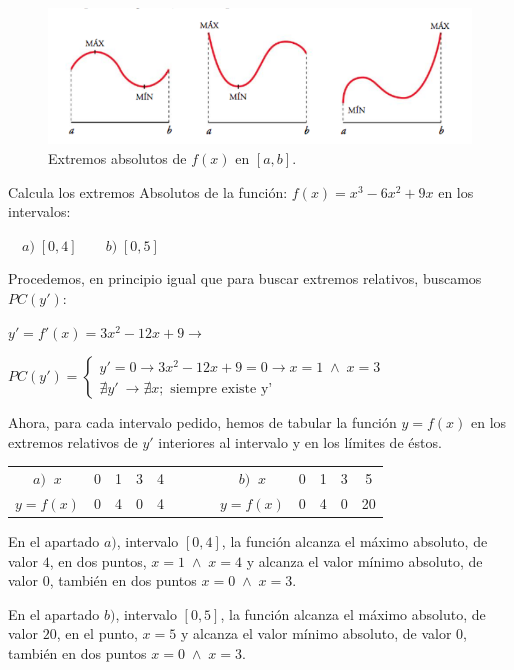 	
	\begin{figure}[H]
		\centering
		\includegraphics[width=1\textwidth]{imagenes/imagenes05/T05IM08.png}
		\caption{Extremos absolutos de $f(x)$ en $[a,b]$.}
	\end{figure}
	
	
	\begin{ejem} Calcula los extremos Absolutos de la función:  $f(x)=x^3-6x^2+9x$ en los intervalos:
	
	$\quad a)\; [0,4] \qquad b)\; [0,5]$
	
	Procedemos, en principio igual que para buscar extremos relativos, buscamos $PC(y')$:
	
	$y'=f'(x)=3x^2-12 x+9 \to $
	
	$PC(y') =\begin{cases}
	y'=0 \to 3x^2-12x+9=0 \to x=1 \; \wedge \; x=3 \\
	\nexists y' \ \to  \nexists x ; \mbox{ siempre existe y'}
	\end{cases}$
	
	Ahora, para cada intervalo pedido, hemos de tabular la función $y=f(x)$ en los extremos relativos de $y'$ interiores al intervalo y en los límites de éstos.
	
	\begin{table}[H]
	\centering
	\begin{tabular}{|c|c|c|c|c|c|c|c|c|c|c|}
	\cline{1-5} \cline{7-11}
	 $a) \; \;  x$& 0& 1 & 3 & 4 & $\qquad$ & $b)\; \;  x$ & 0 & 1 & 3  & 5 \\ \cline{1-5} \cline{7-11} 
 	$y=f(x)$& 0 & 4 & 0 & 4 & $\qquad$ &$ y=f(x)$  & 0 & 4 & 0 & 20 \\ \cline{1-5} \cline{7-11} 
	\end{tabular}
	\end{table}
	
	En el apartado $a)$, intervalo $[0,4]$, la función alcanza el máximo absoluto, de valor $4$, en dos puntos, $x=1 \; \wedge \; x=4$ y alcanza el valor mínimo absoluto, de valor $0$, también en dos puntos $x=0\; \wedge \; x=3$.
	
	En el apartado $b)$, intervalo $[0,5]$, la función alcanza el máximo absoluto, de valor $20$, en el punto, $x=5$ y alcanza el valor mínimo absoluto, de valor $0$, también en dos puntos $x=0\; \wedge \; x=3$.
	
	\end{ejem}
	
